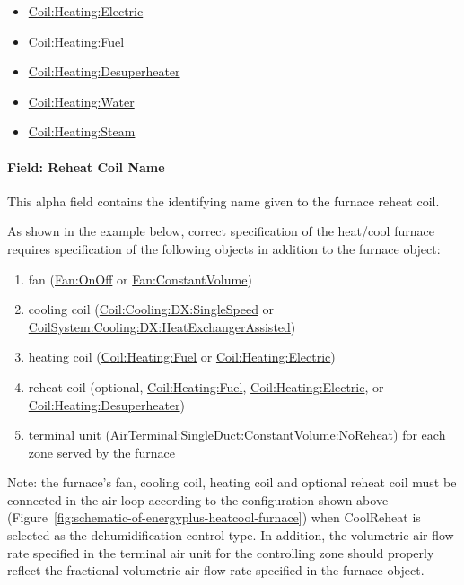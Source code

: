 \begin{itemize}
\item
  \hyperref[coilheatingelectric]{Coil:Heating:Electric}
\item
  \hyperref[coilheatinggas-000]{Coil:Heating:Fuel}
\item
  \hyperref[coilheatingdesuperheater]{Coil:Heating:Desuperheater}
\item
  \hyperref[coilheatingwater]{Coil:Heating:Water}
\item
  \hyperref[coilheatingsteam]{Coil:Heating:Steam}
\end{itemize}

\paragraph{Field: Reheat Coil Name}\label{field-reheat-coil-name-000}

This alpha field contains the identifying name given to the furnace reheat coil.

As shown in the example below, correct specification of the heat/cool furnace requires specification of the following objects in addition to the furnace object:

\begin{enumerate}
\def\labelenumi{\arabic{enumi})}
\item
  fan (\hyperref[fanonoff]{Fan:OnOff} or \hyperref[fanconstantvolume]{Fan:ConstantVolume})
\item
  cooling coil (\hyperref[coilcoolingdxsinglespeed]{Coil:Cooling:DX:SingleSpeed} or \hyperref[coilsystemcoolingdxheatexchangerassisted]{CoilSystem:Cooling:DX:HeatExchangerAssisted})
\item
  heating coil (\hyperref[coilheatinggas-000]{Coil:Heating:Fuel} or \hyperref[coilheatingelectric]{Coil:Heating:Electric})
\item
  reheat coil (optional, \hyperref[coilheatinggas-000]{Coil:Heating:Fuel}, \hyperref[coilheatingelectric]{Coil:Heating:Electric}, or \hyperref[coilheatingdesuperheater]{Coil:Heating:Desuperheater})
\item
  terminal unit (\hyperref[airterminalsingleductconstantvolumenoreheat]{AirTerminal:SingleDuct:ConstantVolume:NoReheat}) for each zone served by the furnace
\end{enumerate}

Note: the furnace's fan, cooling coil, heating coil and optional reheat coil must be connected in the air loop according to the configuration shown above (Figure~\ref{fig:schematic-of-energyplus-heatcool-furnace}) when CoolReheat is selected as the dehumidification control type. In addition, the volumetric air flow rate specified in the terminal air unit for the controlling zone should properly reflect the fractional volumetric air flow rate specified in the furnace object.

